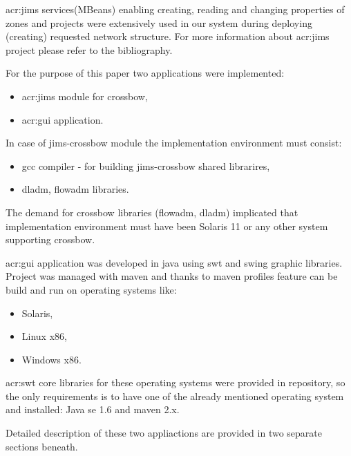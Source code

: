 \documentclass[11pt]{book}
\begin{document}
      \gls{acr:jims} services(MBeans) enabling creating, reading and changing properties of zones and projects were extensively
      used in our system during deploying (creating) requested network structure. For more information about \gls{acr:jims}
      project please refer to the bibliography.	
    
      \medskip
	
      For the purpose of this paper two applications were implemented:
	
      \begin{itemize}
        \item \gls{acr:jims} module for crossbow,
        \item \gls{acr:gui} application.
      \end{itemize}
	  
	  \medskip
	
      In case of jims-crossbow module the implementation environment must consist:

      \begin{itemize}
        \item gcc compiler - for building jims-crossbow shared librarires,
        \item dladm, flowadm libraries.
      \end{itemize}
	
      The demand for crossbow libraries (flowadm, dladm) implicated that implementation environment must have been
      Solaris 11 or any other system supporting crossbow.
    
      \gls{acr:gui} application was developed in java using swt and swing graphic libraries. Project was managed with maven and
      thanks to maven profiles feature can be build and run on operating systems like:

      \begin{itemize}
        \item Solaris,
        \item Linux x86,
        \item Windows x86.
      \end{itemize}

      \gls{acr:swt} core libraries for these operating systems were provided in repository, so the only requirements is to have
      one of the already mentioned operating system and installed: Java se 1.6 and maven 2.x.
	  
	  \medskip
	  
	  Detailed description of these two appliactions are provided in two separate sections beneath. 
	  
\end{document}
